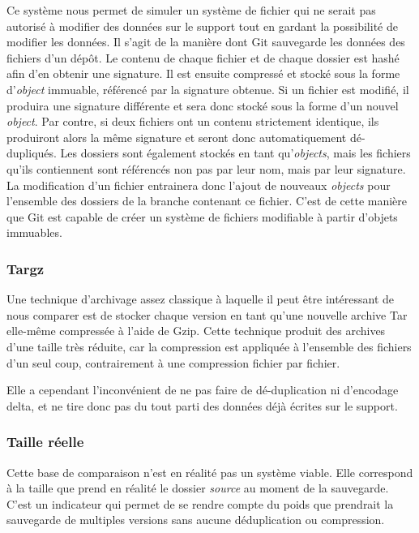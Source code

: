 \documentclass[a4paper,twocolumn]{article}
\begin{document}
Ce système nous permet de simuler un système de fichier qui ne serait
pas autorisé à modifier des données sur le support tout en gardant la
possibilité de modifier les données. Il s'agit de la manière dont Git
sauvegarde les données des fichiers d'un dépôt. Le contenu de chaque
fichier et de chaque dossier est hashé afin d'en obtenir une signature.
Il est ensuite compressé et stocké sous la forme d'\emph{object}
immuable, référencé par la signature obtenue. Si un fichier est modifié,
il produira une signature différente et sera donc stocké sous la forme
d'un nouvel \emph{object}. Par contre, si deux fichiers ont un contenu
strictement identique, ils produiront alors la même signature et seront
donc automatiquement dé-dupliqués. Les dossiers sont également stockés
en tant qu'\emph{objects}, mais les fichiers qu'ils contiennent sont
référencés non pas par leur nom, mais par leur signature. La
modification d'un fichier entrainera donc l'ajout de nouveaux
\emph{objects} pour l'ensemble des dossiers de la branche contenant ce
fichier. C'est de cette manière que Git est capable de créer un système
de fichiers modifiable à partir d'objets immuables.

\subsubsection{Targz}

Une technique d'archivage assez classique à laquelle il peut être
intéressant de nous comparer est de stocker chaque version en tant
qu'une nouvelle archive Tar elle-même compressée à l'aide de Gzip. Cette
technique produit des archives d'une taille très réduite, car la
compression est appliquée à l'ensemble des fichiers d'un seul coup,
contrairement à une compression fichier par fichier.

Elle a cependant l'inconvénient de ne pas faire de dé-duplication ni
d'encodage delta, et ne tire donc pas du tout parti des données déjà
écrites sur le support.

\subsubsection{Taille réelle}

Cette base de comparaison n'est en réalité pas un système viable. Elle
correspond à la taille que prend en réalité le dossier \emph{source} au
moment de la sauvegarde. C'est un indicateur qui permet de se rendre
compte du poids que prendrait la sauvegarde de multiples versions sans
aucune déduplication ou compression.
\end{document}
